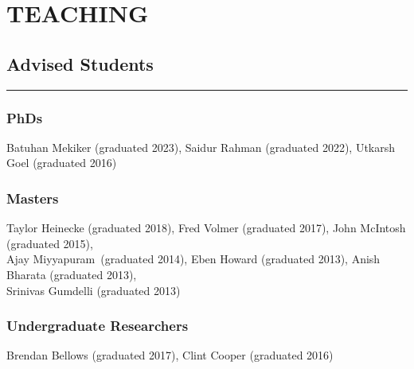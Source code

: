\section*{TEACHING}


%
%




\subsection*{Advised Students}
\hrule
\vspace{0.2cm}

\subsubsection*{PhDs}

Batuhan Mekiker (graduated 2023),
Saidur Rahman (graduated 2022),
Utkarsh Goel (graduated 2016)



\subsubsection*{Masters}
Taylor Heinecke (graduated 2018),
Fred Volmer (graduated 2017),
John McIntosh (graduated 2015), \\
Ajay Miyyapuram~(graduated 2014),
Eben Howard (graduated 2013),
Anish Bharata (graduated 2013), \\
Srinivas Gumdelli (graduated 2013)


\subsubsection*{Undergraduate Researchers}
Brendan Bellows (graduated 2017),
Clint Cooper (graduated 2016)



